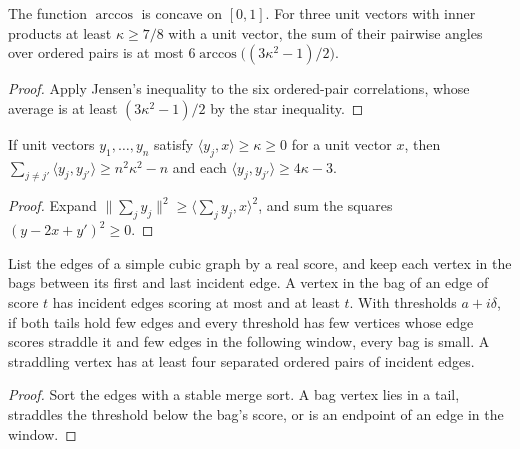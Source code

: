\begin{lemma}
  \label{lem:lowerbounds-algebraic-gaussian-arccos-star}
  \leanok
  The function $\arccos$ is concave on $[0,1]$. For three unit vectors with inner products
  at least $\kappa\ge7/8$ with a unit vector, the sum of their pairwise angles over ordered
  pairs is at most $6\arccos\bigl((3\kappa^2-1)/2\bigr)$.
\end{lemma}
\begin{proof}
  \leanok
  Apply Jensen's inequality to the six ordered-pair correlations, whose average is at least
  $(3\kappa^2-1)/2$ by the star inequality.
\end{proof}

\begin{lemma}
  \label{lem:lowerbounds-algebraic-gaussian-star}
  \leanok
  If unit vectors $y_1,\dots,y_n$ satisfy $\langle y_j,x\rangle\ge\kappa\ge0$ for a
  unit vector $x$, then $\sum_{j\ne j'}\langle y_j,y_{j'}\rangle\ge n^2\kappa^2-n$ and
  each $\langle y_j,y_{j'}\rangle\ge4\kappa-3$.
\end{lemma}
\begin{proof}
  \leanok
  Expand $\lVert\sum_j y_j\rVert^2\ge\langle\sum_j y_j,x\rangle^2$, and sum the
  squares $(y-2x+y')^2\ge0$.
\end{proof}

\begin{lemma}
  \label{lem:lowerbounds-algebraic-gaussian-edge-order}
  \leanok
  List the edges of a simple cubic graph by a real score, and keep each vertex in
  the bags between its first and last incident edge. A vertex in the bag of an
  edge of score $t$ has incident edges scoring at most and at least $t$. With
  thresholds $a+i\delta$, if both tails hold few edges and every threshold has few
  vertices whose edge scores straddle it and few edges in the following window, every
  bag is small. A straddling vertex has at least four separated ordered pairs of
  incident edges.
\end{lemma}
\begin{proof}
  \leanok
  Sort the edges with a stable merge sort. A bag vertex lies in a tail, straddles
  the threshold below the bag's score, or is an endpoint of an edge in the window.
\end{proof}

